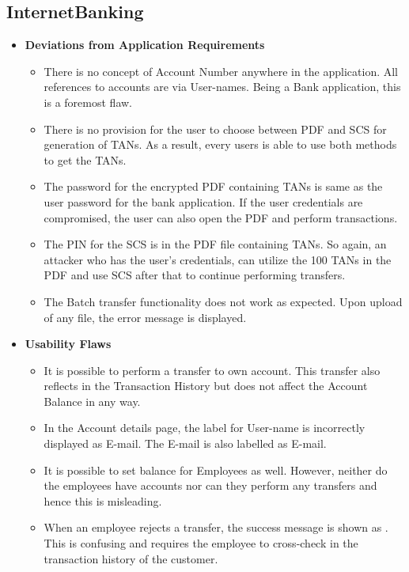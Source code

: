 \subsection{InternetBanking}

\begin{itemize}
    \item \textbf{Deviations from Application Requirements}
        \begin{itemize}
            \item There is no concept of Account Number anywhere in the application. All references to accounts are via User-names. Being a Bank application, this is a foremost flaw.
            \item There is no provision for the user to choose between PDF and SCS for generation of TANs. As a result, every users is able to use both methods to get the TANs.
            \item The password for the encrypted PDF containing TANs is same as the user password for the bank application. If the user credentials are compromised, the user can also open the PDF and perform transactions.
            \item The PIN for the SCS is in the PDF file containing TANs. So again, an attacker who has the user’s credentials, can utilize the 100 TANs in the PDF and use SCS after that to continue performing transfers.
            \item The Batch transfer functionality does not work as expected. Upon upload of any file, the error message  is displayed.
        \end{itemize}
    \item \textbf{Usability Flaws}
        \begin{itemize}
            \item It is possible to perform a transfer to own account. This transfer also reflects in the Transaction History but does not affect the Account Balance in any way.
            \item In the Account details page, the label for User-name is incorrectly displayed as E-mail. The E-mail is also labelled as E-mail.
            \item It is possible to set balance for Employees as well. However, neither do the employees have accounts nor can they perform any transfers and hence this is misleading.
            \item When an employee rejects a transfer, the success message is shown as . This is confusing and requires the employee to cross-check in the transaction history of the customer.

\end{itemize}
\end{itemize}
